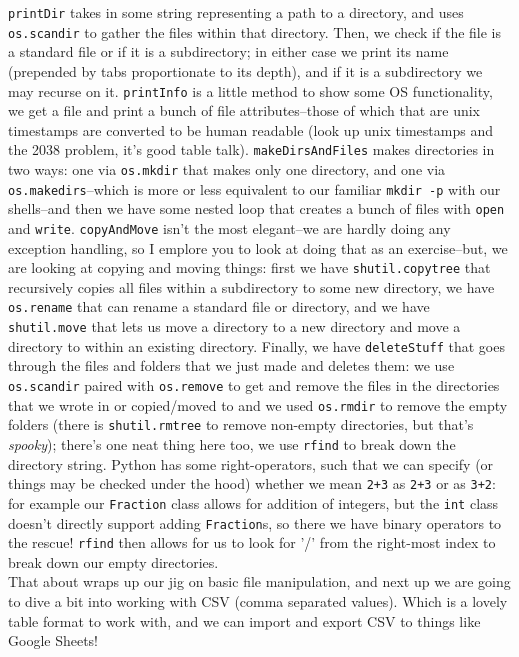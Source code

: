 \documentclass[12pt]{article}
\begin{document}
\texttt{printDir} takes in some string representing a path to a directory, and uses \texttt{os.scandir} to gather the files within that directory. Then, we check if the file is a standard file or if it is a subdirectory; in either case we print its name (prepended by tabs proportionate to its depth), and if it is a subdirectory we may recurse on it. \texttt{printInfo} is a little method to show some OS functionality, we get a file and print a bunch of file attributes--those of which that are unix timestamps are converted to be human readable (look up unix timestamps and the 2038 problem, it's good table talk). \texttt{makeDirsAndFiles} makes directories in two ways: one via \texttt{os.mkdir} that makes only one directory, and one via \texttt{os.makedirs}--which is more or less equivalent to our familiar \texttt{mkdir -p} with our shells--and then we have some nested loop that creates a bunch of files with \texttt{open} and \texttt{write}. \texttt{copyAndMove} isn't the most elegant--we are hardly doing any exception handling, so I emplore you to look at doing that as an exercise--but, we are looking at copying and moving things: first we have \texttt{shutil.copytree} that recursively copies all files within a subdirectory to some new directory, we have \texttt{os.rename} that can rename a standard file or directory, and we have \texttt{shutil.move} that lets us move a directory to a new directory and move a directory to within an existing directory. Finally, we have \texttt{deleteStuff} that goes through the files and folders that we just made and deletes them: we use \texttt{os.scandir} paired with \texttt{os.remove} to get and remove the files in the directories that we wrote in or copied/moved to and we used \texttt{os.rmdir} to remove the empty folders (there is \texttt{shutil.rmtree} to remove non-empty directories, but that's \textit{spooky}); there's one neat thing here too, we use \texttt{rfind} to break down the directory string. Python has some right-operators, such that we can specify (or things may be checked under the hood) whether we mean \texttt{2+3} as \texttt{2+3} or as \texttt{3+2}: for example our \texttt{Fraction} class allows for addition of integers, but the \texttt{int} class doesn't directly support adding \texttt{Fraction}s, so there we have binary operators to the rescue! \texttt{rfind} then allows for us to look for '/' from the right-most index to break down our empty directories.\\
That about wraps up our jig on basic file manipulation, and next up we are going to dive a bit into working with CSV (comma separated values). Which is a lovely table format to work with, and we can import and export CSV to things like Google Sheets!\\
\end{document}
